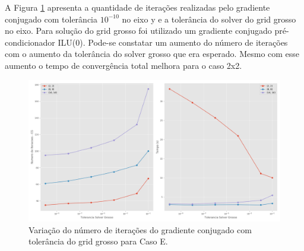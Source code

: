 A Figura \ref{fig:toleranciaGrossa} apresenta a quantidade de iterações realizadas pelo gradiente conjugado com tolerância $10^{-10}$ no eixo y e a tolerância do solver do grid grosso no eixo. Para solução do grid grosso foi utilizado um gradiente conjugado pré-condicionador ILU(0). Pode-se constatar um aumento do número de iterações com o aumento da tolerância do solver grosso que era esperado. Mesmo com esse aumento o tempo de convergência total melhora para o caso 2x2.



\begin{figure}[!htbp]
\centering
\includegraphics[width=\textwidth]{chap08/figs/Acuracia93MM.png}
\caption{ Variação do número de iterações do gradiente conjugado com tolerância do grid grosso para Caso E.}
\label{fig:toleranciaGrossa}
\end{figure}


